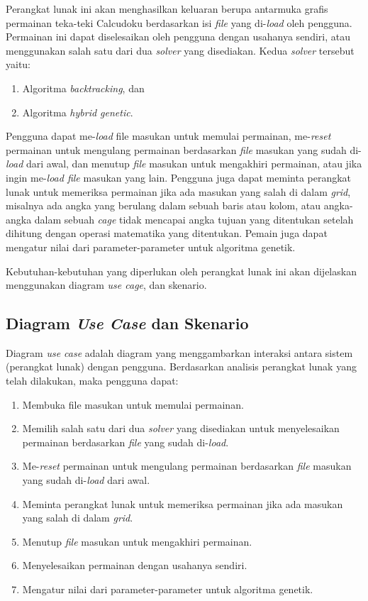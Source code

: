 Perangkat lunak ini akan menghasilkan keluaran berupa antarmuka grafis permainan teka-teki Calcudoku berdasarkan isi \textit{file}  yang di-\textit{load} oleh pengguna. Permainan ini dapat diselesaikan oleh pengguna dengan usahanya sendiri, atau menggunakan salah satu dari dua \textit{solver} yang disediakan.  Kedua \textit{solver} tersebut yaitu:

\begin{enumerate}
\item Algoritma \textit{backtracking}, dan
\item Algoritma \textit{hybrid genetic}.
\end{enumerate}

Pengguna dapat me-\textit{load} file masukan untuk memulai permainan, me-\textit{reset} permainan untuk mengulang permainan berdasarkan \textit{file} masukan yang sudah di-\textit{load} dari awal, dan menutup \textit{file} masukan untuk mengakhiri permainan, atau jika ingin me-\textit{load file} masukan yang lain. Pengguna juga dapat meminta perangkat lunak untuk memeriksa permainan jika ada masukan yang salah di dalam \textit{grid}, misalnya ada angka yang berulang dalam sebuah baris atau kolom, atau angka-angka dalam sebuah \textit{cage} tidak mencapai angka tujuan yang ditentukan setelah dihitung dengan operasi matematika yang ditentukan. Pemain juga dapat mengatur nilai dari parameter-parameter untuk algoritma genetik.

Kebutuhan-kebutuhan yang diperlukan oleh perangkat lunak ini akan dijelaskan menggunakan diagram \textit{use cage}, dan skenario.

\subsection{Diagram \textit{Use Case} dan Skenario}
\label{sec:analisisusecase}

Diagram \textit{use case} adalah diagram yang menggambarkan interaksi antara sistem (perangkat lunak) dengan pengguna. Berdasarkan analisis perangkat lunak yang telah dilakukan, maka pengguna dapat:

\begin{enumerate}
\item Membuka file masukan untuk memulai permainan.
\item Memilih salah satu dari dua \textit{solver} yang disediakan untuk menyelesaikan permainan berdasarkan \textit{file} yang sudah di-\textit{load}.
\item Me-\textit{reset} permainan untuk mengulang permainan berdasarkan \textit{file} masukan yang sudah di-\textit{load} dari awal.
\item Meminta perangkat lunak untuk memeriksa permainan jika ada masukan yang salah di dalam \textit{grid}.
\item Menutup \textit{file} masukan untuk mengakhiri permainan.
\item Menyelesaikan permainan dengan usahanya sendiri.
\item Mengatur nilai dari parameter-parameter untuk algoritma genetik.
\end{enumerate}

